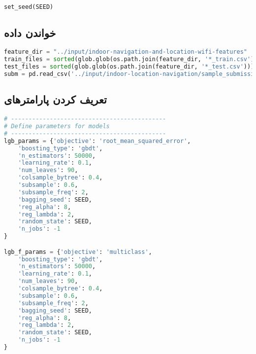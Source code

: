 \documentclass{article}
\begin{document}
\subsection*{}
\begin{latin}
\begin{lstlisting}[language=Python]
set_seed(SEED)
\end{lstlisting}
\end{latin}
\subsection*{خواندن داده}
\begin{latin}
\begin{lstlisting}[language=Python]
feature_dir = "../input/indoor-navigation-and-location-wifi-features"
train_files = sorted(glob.glob(os.path.join(feature_dir, '*_train.csv')))
test_files = sorted(glob.glob(os.path.join(feature_dir, '*_test.csv')))
subm = pd.read_csv('../input/indoor-location-navigation/sample_submission.csv', index_col=0)
\end{lstlisting}
\end{latin}
\subsection*{تعریف کردن پارامترهای }
\begin{latin}
\begin{lstlisting}[language=Python]
# --------------------------------------------
# Define parameters for models
# --------------------------------------------
lgb_params = {'objective': 'root_mean_squared_error',
	'boosting_type': 'gbdt',
	'n_estimators': 50000,
	'learning_rate': 0.1,
	'num_leaves': 90,
	'colsample_bytree': 0.4,
	'subsample': 0.6,
	'subsample_freq': 2,
	'bagging_seed': SEED,
	'reg_alpha': 8,
	'reg_lambda': 2,
	'random_state': SEED,
	'n_jobs': -1
}

lgb_f_params = {'objective': 'multiclass',
	'boosting_type': 'gbdt',
	'n_estimators': 50000,
	'learning_rate': 0.1,
	'num_leaves': 90,
	'colsample_bytree': 0.4,
	'subsample': 0.6,
	'subsample_freq': 2,
	'bagging_seed': SEED,
	'reg_alpha': 8,
	'reg_lambda': 2,
	'random_state': SEED,
	'n_jobs': -1
}
\end{lstlisting}
\end{latin}
\end{document}
